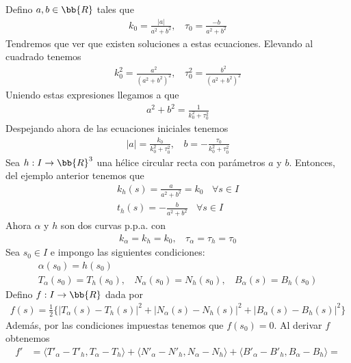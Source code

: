 \begin{ejercicio}
\begin{enumerate}
        Defino $a,b \in \bb{R}$ tales que 
        \begin{gather*}
            k_0 = \frac{|a|}{a^2 + b^2},\ \ \ \
            \tau_0 = \frac{-b}{a^2 + b^2}
        \end{gather*}
        Tendremos que ver que existen soluciones a estas ecuaciones. Elevando al cuadrado tenemos 
        \begin{gather*}
            k_0^2 = \frac{a^2}{(a^2 + b^2)^2},\ \ \ \
            \tau_0^2 = \frac{b^2}{(a^2 + b^2)^2}
        \end{gather*}
        Uniendo estas expresiones llegamos a que 
        \begin{gather*}
            a^2 + b^2 = \frac{1}{k_0^2 + \tau_0^2}
        \end{gather*}
        Despejando ahora de las ecuaciones iniciales tenemos 
        \begin{gather*}
            |a| = \frac{k_0}{k_0^2 + \tau_0^2},\ \ \ \ b = - \frac{\tau_0}{k_0^2 + \tau_0^2}
        \end{gather*}
        Sea $h:I\to \bb{R}^3$ una hélice circular recta con parámetros $a$ y $b$. Entonces, del ejemplo anterior tenemos que 
        \begin{gather*}
            k_h(s) = \frac{a}{a^2 + b^2} = k_0\ \ \ \ \forall s \in I\\
            t_h(s) = - \frac{b}{a^2 + b^2}\ \ \ \ \forall s \in I
        \end{gather*}
        Ahora $\alpha$ y $h$ son dos curvas p.p.a. con 
        \begin{gather*}
            k_\alpha = k_h = k_0,\ \ \ \ \tau_\alpha = \tau_h = \tau_0
        \end{gather*}
        Sea $s_0\in I$ e impongo las siguientes condiciones:
        \begin{gather*}
            \alpha(s_0)=h(s_0)\\
            T_\alpha(s_0) = T_h(s_0),\ \ \ \ N_\alpha(s_0) = N_h(s_0),\ \ \ \ B_\alpha(s) = B_h(s_0)
        \end{gather*}
        Defino $f:I\to \bb{R}$ dada por 
        \begin{gather*}
            f(s) = \frac{1}{2} \{|T_\alpha(s) - T_h(s)|^2 + |N_\alpha(s) - N_h(s)|^2 + |B_\alpha(s) - B_h(s)|^2\}
        \end{gather*}
        Además, por las condiciones impuestas tenemos que $f(s_0)=0$. Al derivar $f$ obtenemos 
        \begin{align*}
            f' &= \langle T'_\alpha - T'_h, T_\alpha - T_h\rangle + \langle N'_\alpha - N'_h, N_\alpha - N_h\rangle + \langle B'_\alpha - B'_h, B_\alpha - B_h\rangle = \\

\end{align*}
\end{enumerate}
\end{ejercicio}
